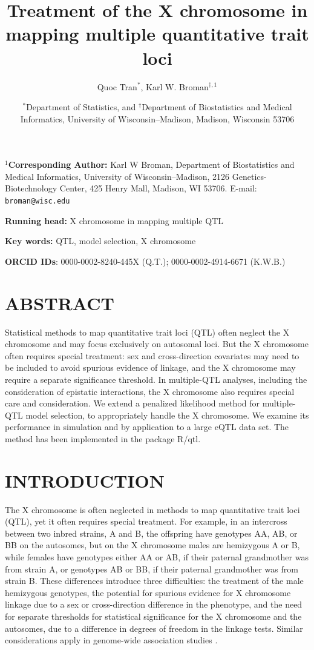 \documentclass[12pt,letterpaper]{article}
\title{Treatment of the X chromosome in \\
mapping multiple quantitative trait loci}
\author{Quoc Tran$^{*}$, Karl W. Broman$^{\dagger,1}$}
\date{$^*$Department of Statistics, and $^\dagger$Department of
Biostatistics and Medical Informatics,
University of Wisconsin--Madison, Madison, Wisconsin
53706}
\begin{document}
\maketitle


\noindent \textbf{$^{1}$Corresponding Author:} Karl W Broman, Department of
Biostatistics and Medical Informatics, University of
Wisconsin--Madison, 2126 Genetics-Biotechnology Center, 425 Henry
Mall, Madison, WI 53706. E-mail: \verb|broman@wisc.edu|

\bigskip
\noindent \textbf{Running head:} X chromosome in mapping multiple QTL


\bigskip
\noindent \textbf{Key words:} QTL, model selection, X chromosome

\noindent \textbf{ORCID IDs}:
0000-0002-8240-445X (Q.T.);
0000-0002-4914-6671 (K.W.B.)


\clearpage

\section*{ABSTRACT}

Statistical methods to map quantitative trait loci (QTL) often neglect
the X chromosome and may focus exclusively on autosomal loci. But
the X chromosome often requires special treatment: sex and
cross-direction covariates may need to be included to avoid spurious
evidence of linkage, and the X chromosome may require a separate
significance threshold. In multiple-QTL analyses, including the
consideration of epistatic interactions, the X chromosome also
requires special care and consideration. We extend a penalized
likelihood method for multiple-QTL model selection, to appropriately handle the X
chromosome. We examine its performance in simulation and by
application to a large eQTL data set. The method has been implemented
in the package R/qtl.




\clearpage

\section*{INTRODUCTION}

The X chromosome is often neglected in methods to map quantitative
trait loci (QTL), yet it often requires special treatment. For
example, in an intercross between two inbred strains, A and B, the
offspring have genotypes AA, AB, or BB on the autosomes, but on the X
chromosome males are hemizygous A or B, while females have genotypes
either AA or AB, if their paternal grandmother was from strain A, or
genotypes AB or BB, if their paternal grandmother was from strain B.
These differences introduce three difficulties: the treatment of the
male hemizygous genotypes, the potential for spurious evidence for X
chromosome linkage due to a sex or cross-direction difference in the
phenotype, and the need for separate thresholds for statistical
significance for the X chromosome and the autosomes, due to a difference
in degrees of freedom in the linkage tests.
Similar considerations apply in genome-wide association studies
\citep{Zheng2007,Clayton2008,Hickey2011}.
\end{document}
